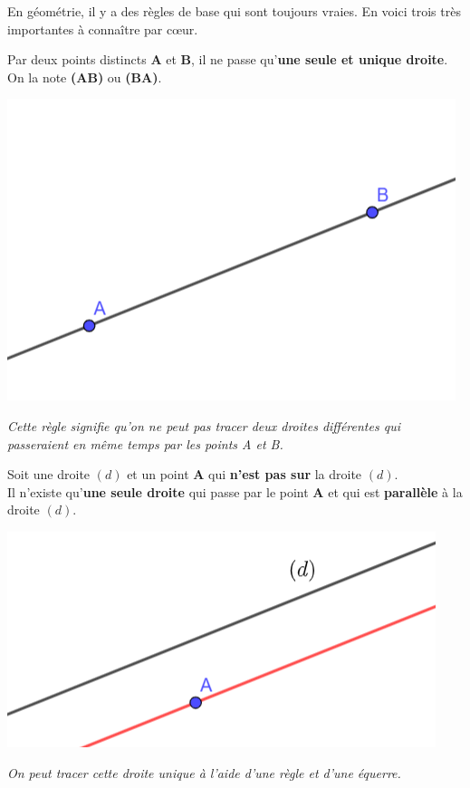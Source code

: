 \noindent %
En géométrie, il y a des règles de base qui sont toujours vraies. 
En voici trois très importantes à connaître par cœur.

\begin{proprietebox}
Par deux points distincts \textbf{A} et \textbf{B}, il ne passe qu'\textbf{une seule et unique droite}.\\
On la note \textbf{(AB)} ou \textbf{(BA)}.
\vspace{0.5cm}
\begin{center}
	\includegraphics[width=0.5\linewidth]{../../assets/images/6e/seq_02/point_droite}
\end{center}
\textit{Cette règle signifie qu'on ne peut pas tracer deux droites différentes qui passeraient en même temps par les points A et B.}
\end{proprietebox}

\begin{proprietebox}
Soit une droite $(d)$ et un point \textbf{A} qui \textbf{n'est pas sur} la droite $(d)$.\\
Il n'existe qu'\textbf{une seule droite} qui passe par le point \textbf{A} et qui est \textbf{parallèle} à la droite $(d)$.

\vspace{0.5cm}

\begin{center}
	\includegraphics[width=0.5\linewidth]{../../assets/images/6e/seq_02/point_droite_parallele}
\end{center}


\vspace{0.5cm}

\textit{On peut tracer cette droite unique à l'aide d'une règle et d'une équerre.}

\end{proprietebox}

